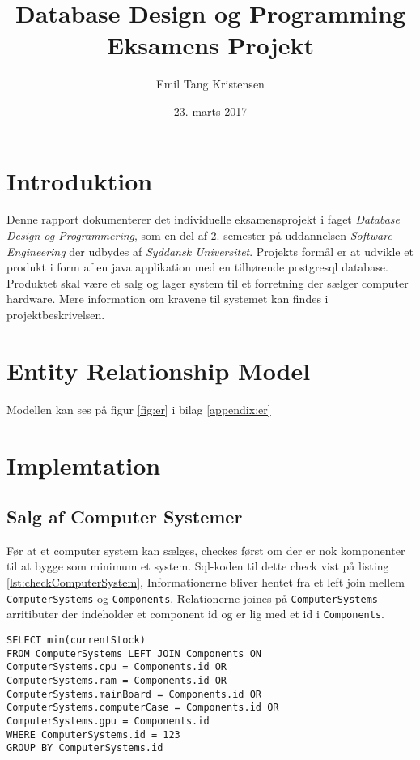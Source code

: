 \documentclass[a4paper]{article}
\title{\textbf{Database Design og Programming Eksamens Projekt}}
\author{Emil Tang Kristensen}
\date{23. marts 2017}
\begin{document}
\maketitle
\tableofcontents

\section{Introduktion}
Denne rapport dokumenterer det individuelle eksamensprojekt i faget \emph{Database Design og Programmering}, som en del af 2. semester på uddannelsen \emph{Software Engineering} der udbydes af \emph{Syddansk Universitet}.
Projekts formål er at udvikle et produkt i form af en java applikation med en tilhørende postgresql database.
Produktet skal være et salg og lager system til et forretning der sælger computer hardware.
Mere information om kravene til systemet kan findes i projektbeskrivelsen.

\section{Entity Relationship Model}
Modellen kan ses på figur \ref{fig:er} i bilag \ref{appendix:er}

\section{Implemtation}

\subsection{Salg af Computer Systemer}
Før at et computer system kan sælges, checkes først om der er nok komponenter til at bygge som minimum et system. 
Sql-koden til dette check vist på listing \ref{lst:checkComputerSystem},
Informationerne bliver hentet fra et left join mellem \texttt{ComputerSystems} og \texttt{Components}. Relationerne joines på \texttt{ComputerSystems} arritibuter der indeholder et component id og er lig med et id i \texttt{Components}.


\begin{lstlisting}[caption={Check om der er nok komponenter til at sælge et system},label={lst:checkComputerSystem}]
SELECT min(currentStock)
FROM ComputerSystems LEFT JOIN Components ON
ComputerSystems.cpu = Components.id OR
ComputerSystems.ram = Components.id OR
ComputerSystems.mainBoard = Components.id OR
ComputerSystems.computerCase = Components.id OR
ComputerSystems.gpu = Components.id
WHERE ComputerSystems.id = 123
GROUP BY ComputerSystems.id
\end{lstlisting}
\end{document}
